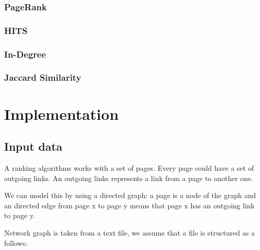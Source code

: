 \documentclass[10pt]{article}
\begin{document}
\subsubsection{PageRank}
\subsubsection{HITS}
\subsubsection{In-Degree}
\subsubsection{Jaccard Similarity}
\section{Implementation}
\subsection{Input data}
A ranking algorithms works with a set of pages. Every page could have a set of outgoing links. An outgoing links represents a link from a page to another one. 

We can model this by using a directed graph: a page is a node of the graph and an directed edge from page x to page y means that page x has an outgoing link to page y.

Network graph is taken from a text file, we assume that a file is structured as a follows:
\end{document}
